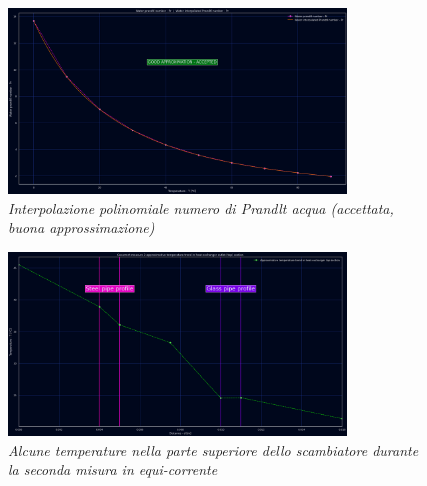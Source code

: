 \documentclass[a4paper,10pt]{article}                                                                                       %
\begin{document}
\begin{figure}[H]                                                                                                           %
  \caption{\textit{Interpolazione polinomiale numero di Prandlt acqua (accettata, buona approssimazione)}}                  %
  \label{fig:water_intp_pr}                                                                                                 %
  \vspace{3mm}                                                                                                              %
  \centering                                                                                                                %
  \includegraphics[width=0.8\textwidth]{../final_doc/code_exports/imgs/water_intp_pr.png}                                   %
\end{figure}                                                                                                                %
\begin{figure}[H]                                                                                                           %
  \caption{\textit{Alcune temperature nella parte superiore dello scambiatore durante la seconda misura in equi-corrente}}  %
  \label{fig:temp_trend}                                                                                                    %
  \vspace{3mm}                                                                                                              %
  \centering                                                                                                                %
  \includegraphics[width=0.8\textwidth]{../final_doc/code_exports/imgs/temp_trend.png}                                      %
\end{figure}                                                                                                                %
\end{document}
